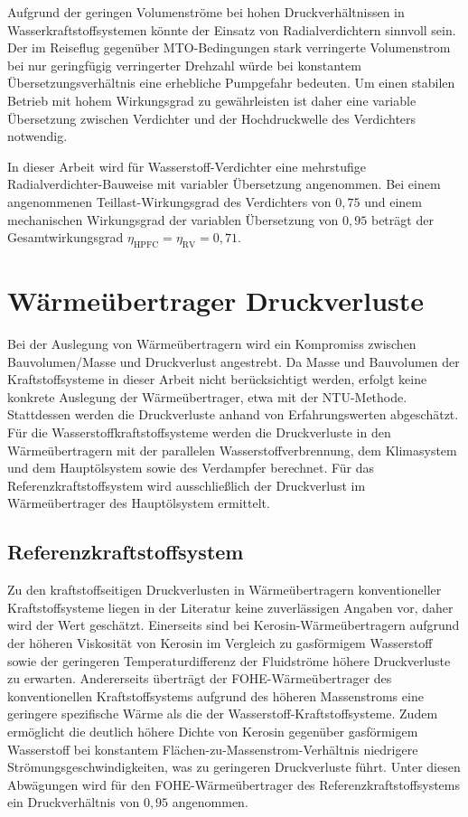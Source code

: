 Aufgrund der geringen Volumenströme bei hohen Druckverhältnissen in Wasserkraftstoffsystemen könnte der Einsatz von Radialverdichtern sinnvoll sein. Der im Reiseflug gegenüber MTO-Bedingungen stark verringerte Volumenstrom bei nur geringfügig verringerter Drehzahl würde bei konstantem Übersetzungsverhältnis eine erhebliche Pumpgefahr bedeuten. Um einen stabilen Betrieb mit hohem Wirkungsgrad zu gewährleisten ist daher eine variable Übersetzung zwischen Verdichter und der Hochdruckwelle des Verdichters notwendig. 

In dieser Arbeit wird für Wasserstoff-Verdichter eine mehrstufige Radialverdichter-Bauweise mit variabler Übersetzung angenommen. Bei einem angenommenen Teillast-Wirkungsgrad des Verdichters von $0,75$ und einem mechanischen Wirkungsgrad der variablen Übersetzung von $0,95$ beträgt der Gesamtwirkungsgrad $\eta_{\mathrm{HPFC}}=\eta_\mathrm{RV}=0,71$.

\section{Wärmeübertrager Druckverluste}

Bei der Auslegung von Wärmeübertragern wird ein Kompromiss zwischen Bauvolumen/Masse und Druckverlust angestrebt. Da Masse und Bauvolumen der Kraftstoffsysteme in dieser Arbeit nicht berücksichtigt werden, erfolgt keine konkrete Auslegung der Wärmeübertrager, etwa mit der NTU-Methode. Stattdessen werden die Druckverluste anhand von Erfahrungswerten abgeschätzt. Für die Wasserstoffkraftstoffsysteme werden die Druckverluste in den Wärmeübertragern mit der parallelen Wasserstoffverbrennung, dem Klimasystem und dem Hauptölsystem sowie des Verdampfer berechnet. Für das Referenzkraftstoffsystem wird ausschließlich der Druckverlust im Wärmeübertrager des Hauptölsystem ermittelt.

\subsection{Referenzkraftstoffsystem}

Zu den kraftstoffseitigen Druckverlusten in Wärmeübertragern konventioneller Kraftstoffsysteme liegen in der Literatur keine zuverlässigen Angaben vor, daher wird der Wert geschätzt. Einerseits sind bei Kerosin-Wärmeübertragern aufgrund der höheren Viskosität von Kerosin im Vergleich zu gasförmigem Wasserstoff sowie der geringeren Temperaturdifferenz der Fluidströme höhere Druckverluste zu erwarten. Andererseits überträgt der FOHE-Wärmeübertrager des konventionellen Kraftstoffsystems aufgrund des höheren Massenstroms eine geringere spezifische Wärme als die der Wasserstoff-Kraftstoffsysteme. Zudem ermöglicht die deutlich höhere Dichte von Kerosin gegenüber gasförmigem Wasserstoff bei konstantem Flächen-zu-Massenstrom-Verhältnis niedrigere Strömungsgeschwindigkeiten, was zu geringeren Druckverluste führt. Unter diesen Abwägungen wird für den FOHE-Wärmeübertrager des Referenzkraftstoffsystems ein Druckverhältnis von $0,95$ angenommen.


